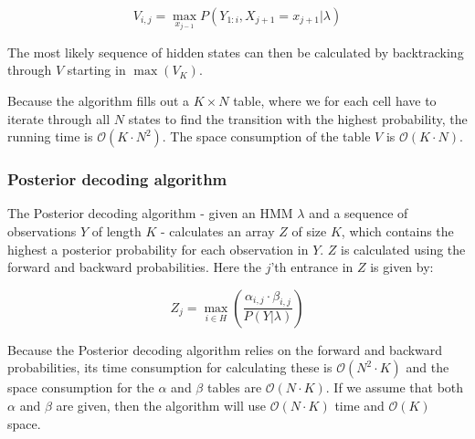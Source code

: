 $$V_{i,j} = \max\limits_{x_{j-1}} P(Y_{1:i}, X_{j+1} = x_{j+1}|\lambda)$$

The most likely sequence of hidden states can then be calculated by backtracking through $V$ starting in $\max(V_K)$.

Because the algorithm fills out a $ K \times  N $ table, where we for each cell have to iterate through all $ N $ states to find the transition with the highest probability, the running time is $\mathcal{O}(K \cdot  N ^2)$. The space consumption of the table $V$ is $\mathcal{O}(K \cdot  N )$.

\subsubsection{Posterior decoding algorithm}

The Posterior decoding algorithm\cite{Bishop} - given an HMM $\lambda$ and a sequence of observations $Y$ of length $K$ - calculates an array $Z$ of size $K$, which contains the highest a posterior  probability for each observation in $Y$. 
$Z$ is calculated using the forward and backward probabilities. Here the $j$'th entrance in $Z$ is given by:

$$Z_j = \max\limits_{i\in H} (\frac{\alpha_{i,j}\cdot\beta_{i,j}}{P(Y|\lambda)})$$

Because the Posterior decoding algorithm relies on the forward and backward probabilities, its time consumption for calculating these is $\mathcal{O}( N^2\cdot K)$ and the space consumption for the $\alpha$ and $\beta$ tables are $\mathcal{O}( N\cdot K)$. If we assume that both $\alpha$ and $\beta$ are given, then the algorithm will use $\mathcal{O}( N\cdot K)$ time and $\mathcal{O}(K)$
space.



